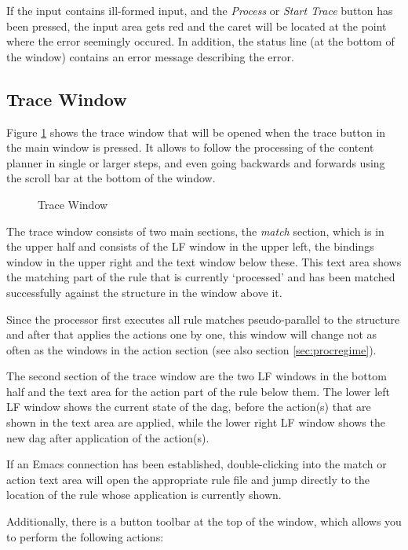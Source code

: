 \documentclass[11pt,a4paper]{article}
\begin{document}
If the input contains ill-formed input, and the \textit{Process} or
\textit{Start Trace} button has been pressed, the input area gets red and the
caret will be located at the point where the error seemingly occured. In
addition, the status line (at the bottom of the window) contains an error
message describing the error.

\subsection{Trace Window}

Figure \ref{fig:tracewindow} shows the trace window that will be opened when
the trace button in the main window is pressed. It allows to follow the
processing of the content planner in single or larger steps, and even going
backwards and forwards using the scroll bar at the bottom of the window.

\begin{figure}[htbp]
  \centering
  \caption{Trace Window}
  \label{fig:tracewindow}
\end{figure}

The trace window consists of two main sections, the \emph{match} section, which
is in the upper half and consists of the LF window in the upper left, the
bindings window in the upper right and the text window below these. This text
area shows the matching part of the rule that is currently `processed' and
has been matched successfully against the structure in the window above it.

Since the processor first executes all rule matches pseudo-parallel to the
structure and after that applies the actions one by one, this window will
change not as often as the windows in the action section (see also section
\ref{sec:procregime}).

The second section of the trace window are the two LF windows in the bottom half
and the text area for the action part of the rule below them. The lower left LF
window shows the current state of the dag, before the action(s) that are shown
in the text area are applied, while the lower right LF window shows the new dag
after application of the action(s).

If an Emacs connection has been established, double-clicking into the match
or action text area will open the appropriate rule file and jump directly to
the location of the rule whose application is currently shown.

Additionally, there is a button toolbar at the top of the window, which allows
you to perform the following actions:
\end{document}
